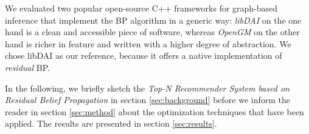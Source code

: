 We evaluated two popular open-source C++ frameworks for graph-based inference that implement the BP algorithm in a generic way: \textit{libDAI} \cite{Mooij_libDAI_10} on the one hand is a clean and accessible piece of software, whereas \textit{OpenGM} \cite{andres2012opengm} on the other hand is richer in feature and written with a higher degree of abstraction. We chose libDAI as our reference, because it offers a native implementation of \textit{residual} BP. 

In the following, we briefly sketch the \textit{Top-N Recommender System based on Residual Belief Propagation} in section \ref{sec:background} before we inform the reader in section \ref{sec:method} about the optimization techniques that have been applied. The results are presented in section \ref{sec:results}.